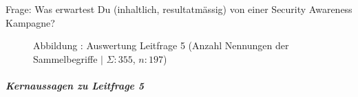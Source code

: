\documentclass[../../main.tex]{subfiles}
\begin{document}
\begin{sloppypar}
Frage: Was erwartest Du (inhaltlich, resultatmässig) von einer Security Awareness Kampagne?

\end{sloppypar}

\addtocounter{figure}{1}\begin{figure}[H]
    
    \caption*{Abbildung \thefigure: Auswertung Leitfrage 5 (Anzahl Nennungen der Sammelbegriffe $\vert$ $\Sigma: 355$, $n: 197$)}
    \label{pgfplot_leitfrage5}
\end{figure}

\subparagraph*{Kernaussagen zu Leitfrage 5}\mbox{}
\end{document}
